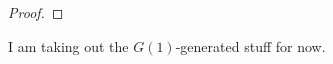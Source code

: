 \documentclass{amsbook} %
\newenvironment{eq*}{\begin{equation*}}{\end{equation*}}
\numberwithin{section}{chapter}
\begin{document}
\begin{proof}
\end{proof}

I am taking out the $G(1)$-generated stuff for now.
\end{document}
